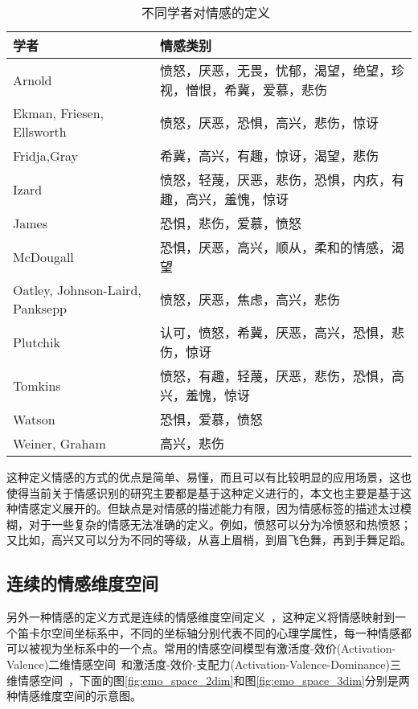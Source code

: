 \begin{table}[htb]
  \centering
  \begin{minipage}[t]{0.8\linewidth} %
  \caption{不同学者对情感的定义~\cite{Ortony1990What, Robinson2013Handbook}}
  \label{tab:emo_categories}
    \begin{tabularx}{\linewidth}{X<{\centering} X<{\centering}}
        \toprule[1.5pt]
        学者 & 情感类别 \\
        \midrule[1pt]
        Arnold & 愤怒，厌恶，无畏，忧郁，渴望，绝望，珍视，憎恨，希冀，爱慕，悲伤 \\
        Ekman, Friesen, Ellsworth & 愤怒，厌恶，恐惧，高兴，悲伤，惊讶 \\
        Fridja,Gray & 希冀，高兴，有趣，惊讶，渴望，悲伤 \\
        Izard & 愤怒，轻蔑，厌恶，悲伤，恐惧，内疚，有趣，高兴，羞愧，惊讶 \\
        James & 恐惧，悲伤，爱慕，愤怒 \\
        McDougall & 恐惧，厌恶，高兴，顺从，柔和的情感，渴望 \\
        Oatley, Johnson-Laird, Panksepp & 愤怒，厌恶，焦虑，高兴，悲伤 \\
        Plutchik & 认可，愤怒，希冀，厌恶，高兴，恐惧，悲伤，惊讶 \\
        Tomkins & 愤怒，有趣，轻蔑，厌恶，悲伤，恐惧，高兴，羞愧，惊讶 \\
        Watson & 恐惧，爱慕，愤怒 \\
        Weiner, Graham & 高兴，悲伤 \\
        \bottomrule[1.5pt]
    \end{tabularx}
  \end{minipage}
\end{table}

这种定义情感的方式的优点是简单、易懂，而且可以有比较明显的应用场景，这也使得当前关于情感识别的研究主要都是基于这种定义进行的，本文也主要是基于这种情感定义展开的。但缺点是对情感的描述能力有限，因为情感标签的描述太过模糊，对于一些复杂的情感无法准确的定义。例如，愤怒可以分为冷愤怒和热愤怒；又比如，高兴又可以分为不同的等级，从喜上眉梢，到眉飞色舞，再到手舞足蹈。

\subsection{连续的情感维度空间}
\label{ssec:continuous_space}
另外一种情感的定义方式是连续的情感维度空间定义~\cite{Cowie2002Emotion}，这种定义将情感映射到一个笛卡尔空间坐标系中，不同的坐标轴分别代表不同的心理学属性，每一种情感都可以被视为坐标系中的一个点。常用的情感空间模型有激活度-效价(Activation-Valence)二维情感空间~\cite{Cowie2002Emotion}和激活度-效价-支配力(Activation-Valence-Dominance)三维情感空间~\cite{Cowie2002Emotion}，下面的图\ref{fig:emo_space_2dim}和图\ref{fig:emo_space_3dim}分别是两种情感维度空间的示意图。

